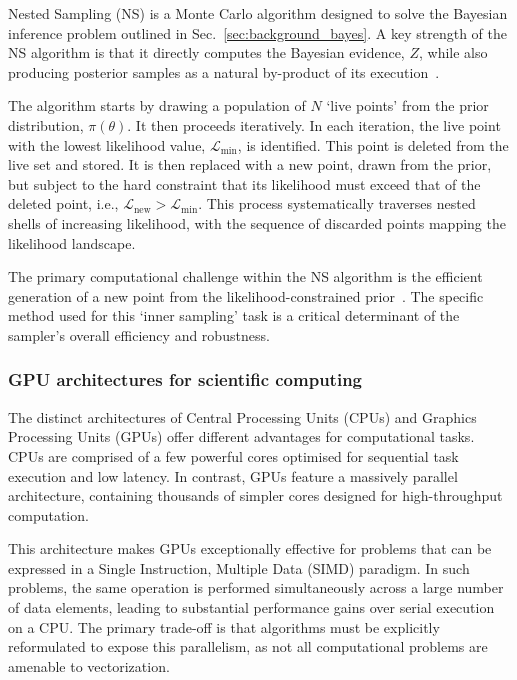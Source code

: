 \documentclass[fleqn,usenatbib]{mnras}
\begin{document}
Nested Sampling (NS) is a Monte Carlo algorithm designed to solve the
Bayesian inference problem outlined in Sec.~\ref{sec:background_bayes}.
A key strength of the NS algorithm is that it directly computes the
Bayesian evidence, $Z$, while also producing posterior samples as a
natural by-product of its execution~\citep{skilling}.

The algorithm starts by drawing a population of $N$ `live points'
from the prior distribution, $\pi(\theta)$. It then proceeds
iteratively. In each iteration, the live point with the lowest
likelihood value, $\mathcal{L}_{\text{min}}$, is identified. This point
is deleted from the live set and stored. It is then replaced with a
new point, drawn from the prior, but subject to the hard constraint that
its likelihood must exceed that of the deleted point,
i.e., $\mathcal{L}_{\text{new}} > \mathcal{L}_{\text{min}}$. This process
systematically traverses nested shells of increasing likelihood, with
the sequence of discarded points mapping the likelihood landscape.

The primary computational challenge within the NS algorithm is the
efficient generation of a new point from the likelihood-constrained
prior~\citep{NSNature}. The specific method used for this `inner sampling' task is a
critical determinant of the sampler's overall efficiency and robustness.

\subsubsection{GPU architectures for scientific computing}
\label{sec:background_gpus}

The distinct architectures of Central Processing Units (CPUs) and
Graphics Processing Units (GPUs) offer different advantages for
computational tasks. CPUs are comprised of a few powerful cores
optimised for sequential task execution and low latency. In contrast,
GPUs feature a massively parallel architecture, containing thousands of
simpler cores designed for high-throughput computation.

This architecture makes GPUs exceptionally effective for problems that can
be expressed in a Single Instruction, Multiple Data (SIMD) paradigm.
In such problems, the same operation is performed simultaneously across
a large number of data elements, leading to substantial performance
gains over serial execution on a CPU. The primary trade-off is that
algorithms must be explicitly reformulated to expose this parallelism,
as not all computational problems are amenable to vectorization.
\end{document}
